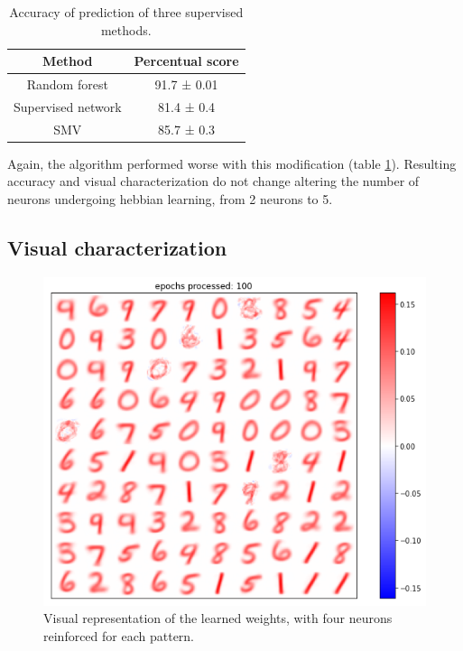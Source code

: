 \documentclass[a4paper]{report}
\begin{document}
\begin{table}[H]
  \begin{center}
    \begin{tabular}{c|c} %
      \textbf{Method} & \textbf{Percentual score}\\
      \hline
      Random forest & 91.7  ± 0.01\\
      Supervised network & 81.4 ± 0.4\\
      SMV & 85.7 ± 0.3\\
    \end{tabular}
  \end{center}
  \caption{Accuracy of prediction of three supervised methods.}
  \label{4tab}
\end{table}

Again, the algorithm performed worse with this modification (table \ref{4tab}).
Resulting accuracy and visual characterization do not change altering the number of neurons undergoing hebbian learning, from 2 neurons to 5.

\subsection{Visual characterization}

\begin{figure} [H]
\centering
\includegraphics [width=12cm ] {h/quattrocinque.png}
\caption{Visual representation of the learned weights, with four neurons reinforced for each pattern.}
\label{multiple}
\end{figure}
\end{document}
